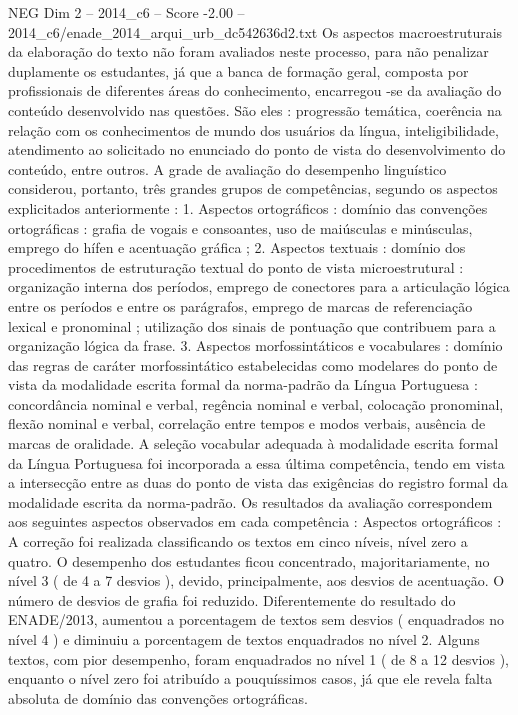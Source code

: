 \begin{textsample}{NEG Dim 2 – 2014\_c6 – Score -2.00 – 2014\_c6/enade\_2014\_arqui\_urb\_dc542636d2.txt}
Os aspectos macroestruturais da elaboração do texto não foram avaliados neste processo, para não penalizar duplamente os estudantes, já que a banca de formação geral, composta por profissionais de diferentes áreas do conhecimento, encarregou -se da avaliação do conteúdo desenvolvido nas questões.
São eles : progressão temática, coerência na relação com os conhecimentos de mundo dos usuários da língua, inteligibilidade, atendimento ao solicitado no enunciado do ponto de vista do desenvolvimento do conteúdo, entre outros.
A grade de avaliação do desempenho linguístico considerou, portanto, três grandes grupos de competências, segundo os aspectos explicitados anteriormente : 1.
Aspectos ortográficos : domínio das convenções ortográficas : grafia de vogais e consoantes, uso de maiúsculas e minúsculas, emprego do hífen e acentuação gráfica ; 2.
Aspectos textuais : domínio dos procedimentos de estruturação textual do ponto de vista microestrutural : organização interna dos períodos, emprego de conectores para a articulação lógica entre os períodos e entre os parágrafos, emprego de marcas de referenciação lexical e pronominal ; utilização dos sinais de pontuação que contribuem para a organização lógica da frase. 3.
Aspectos morfossintáticos e vocabulares : domínio das regras de caráter morfossintático estabelecidas como modelares do ponto de vista da modalidade escrita formal da norma-padrão da Língua Portuguesa : concordância nominal e verbal, regência nominal e verbal, colocação pronominal, flexão nominal e verbal, correlação entre tempos e modos verbais, ausência de marcas de oralidade.
A seleção vocabular adequada à modalidade escrita formal da Língua Portuguesa foi incorporada a essa última competência, tendo em vista a intersecção entre as duas do ponto de vista das exigências do registro formal da modalidade escrita da norma-padrão.
Os resultados da avaliação correspondem aos seguintes aspectos observados em cada competência : Aspectos ortográficos : A correção foi realizada classificando os textos em cinco níveis, nível zero a quatro.
O desempenho dos estudantes ficou concentrado, majoritariamente, no nível 3 ( de 4 a 7 desvios ), devido, principalmente, aos desvios de acentuação.
O número de desvios de grafia foi reduzido.
Diferentemente do resultado do ENADE/2013, aumentou a porcentagem de textos sem desvios ( enquadrados no nível 4 ) e diminuiu a porcentagem de textos enquadrados no nível 2.
Alguns textos, com pior desempenho, foram enquadrados no nível 1 ( de 8 a 12 desvios ), enquanto o nível zero foi atribuído a pouquíssimos casos, já que ele revela falta absoluta de domínio das convenções ortográficas.

\end{textsample}
